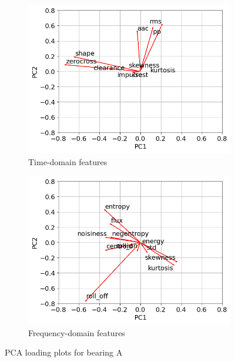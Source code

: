 \begin{figure}[h]
    \centering
    \begin{subfigure}[b]{0.49\textwidth}
        \includegraphics[width=\textwidth]{assets/results/eda/PCA-TD-loading-plot.png}
        \caption{Time-domain features}
    \end{subfigure}
    \hfill
    \begin{subfigure}[b]{0.49\textwidth}
        \includegraphics[width=\textwidth]{assets/results/eda/PCA-FD-loading-plot.png}
        \caption{Frequency-domain features}
    \end{subfigure} 
    \caption{PCA loading plots for bearing A}
    \label{fig:design:pca-loading-plot}
\end{figure}


